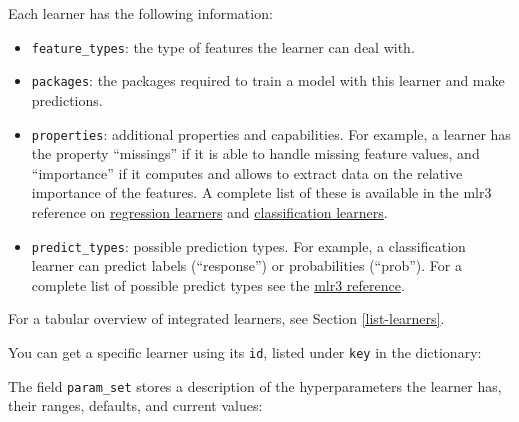 \documentclass[]{article}
\newenvironment{Shaded}{}{}
\newcommand{\KeywordTok}[1]{\textcolor[rgb]{0.00,0.00,1.00}{#1}}
\newcommand{\NormalTok}[1]{#1}
\newcommand{\OperatorTok}[1]{#1}
\newcommand{\StringTok}[1]{\textcolor[rgb]{0.00,0.50,0.50}{#1}}
\providecommand{\tightlist}{%
  \setlength{\itemsep}{0pt}\setlength{\parskip}{0pt}}
\renewenvironment{Shaded} {\begin{snugshade}\small} {\end{snugshade}}
\begin{document}
Each learner has the following information:

\begin{itemize}
\tightlist
\item
  \texttt{feature\_types}: the type of features the learner can deal with.
\item
  \texttt{packages}: the packages required to train a model with this learner and make predictions.
\item
  \texttt{properties}: additional properties and capabilities.
  For example, a learner has the property ``missings'' if it is able to handle missing feature values, and ``importance'' if it computes and allows to extract data on the relative importance of the features.
  A complete list of these is available in the mlr3 reference on \href{https://mlr3.mlr-org.com/reference/LearnerRegr.html\#construction}{regression learners} and \href{https://mlr3.mlr-org.com/reference/LearnerClassif.html\#construction}{classification learners}.
\item
  \texttt{predict\_types}: possible prediction types. For example, a classification learner can predict labels (``response'') or probabilities (``prob''). For a complete list of possible predict types see the \href{https://mlr3.mlr-org.com/reference/Learner.html\#construction}{mlr3 reference}.
\end{itemize}

For a tabular overview of integrated learners, see Section \ref{list-learners}.

You can get a specific learner using its \texttt{id}, listed under \texttt{key} in the dictionary:

\begin{Shaded}
\end{Shaded}

The field \texttt{param\_set} stores a description of the hyperparameters the learner has, their ranges, defaults, and current values:
\end{document}
